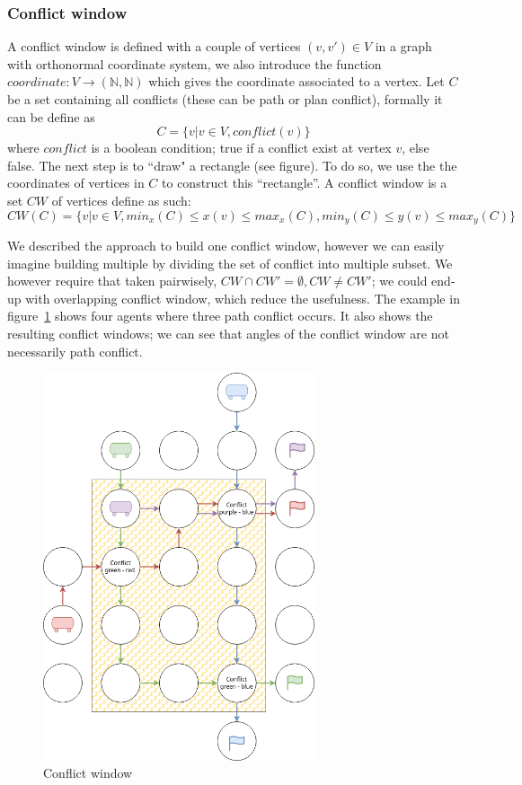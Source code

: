 \subsubsection{Conflict window}\label{sec:conflict_window}
A conflict window is defined with a couple of vertices \((v,v')\in V\) in a graph with orthonormal coordinate system, we also introduce the function \(coordinate:  V \rightarrow (\mathbb{N},\mathbb{N})\) which gives the coordinate associated to a vertex. Let \(C\) be a set containing all conflicts (these can be path or plan conflict), formally it can be define as \[
    C = \{v  | v \in V, conflict(v)\}
\] where \(conflict\) is a boolean condition; true if a conflict exist at vertex \(v\), else false. The next step is to ``draw" a rectangle (see  figure). To do so,  we use the the coordinates of vertices in \(C\) to construct this ``rectangle''. A conflict window is a set \(CW\) of vertices define as such: \[
  CW(C) = \{ v | v \in V, min_x(C) \leq x(v) \leq max_x(C), min_y(C) \leq y(v) \leq max_y(C)\}
\]

We described the approach to build one conflict window, however we can easily imagine building multiple by dividing the set of conflict into multiple subset. We however require that taken pairwisely, \(CW \cap   CW' = \emptyset, CW\neq CW' \); we could end-up with overlapping conflict window, which reduce the usefulness. The example in figure~\ref{img:conflict_window} shows four agents where three path conflict occurs. It also shows the resulting conflict windows; we can see that angles of the conflict window are not necessarily path conflict. 

\begin{figure}[H]
  \centering
  \caption{Conflict window}\label{img:conflict_window}
  \includegraphics[width=8cm]{img/conflict_window.drawio.png}
\end{figure}


